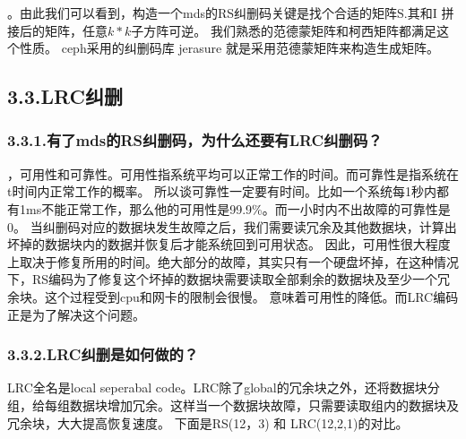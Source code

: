 \documentclass{article}
\begin{document}
。由此我们可以看到，构造一个mds的RS纠删码关键是找个合适的矩阵S.其和I 拼接后的矩阵，任意$k*k$子方阵可逆。
我们熟悉的范德蒙矩阵和柯西矩阵都满足这个性质。 ceph采用的纠删码库 jerasure 就是采用范德蒙矩阵来构造生成矩阵。%

\subsection{3.3.\hspace*{0.5em}LRC纠删}\label{sec-lrc}%

\subsubsection{3.3.1.\hspace*{0.5em}有了mds的RS纠删码，为什么还要有LRC纠删码？}\label{sec-mdsrslrc}%

，可用性和可靠性。可用性指系统平均可以正常工作的时间。而可靠性是指系统在t时间内正常工作的概率。
所以谈可靠性一定要有时间。比如一个系统每1秒内都有1ms不能正常工作，那么他的可用性是99.9\%。而一小时内不出故障的可靠性是0。
当纠删码对应的数据块发生故障之后，我们需要读冗余及其他数据块，计算出坏掉的数据块内的数据并恢复后才能系统回到可用状态。
因此，可用性很大程度上取决于修复所用的时间。绝大部分的故障，其实只有一个硬盘坏掉，在这种情况下，RS编码为了修复这个坏掉的数据块需要读取全部剩余的数据块及至少一个冗余块。这个过程受到cpu和网卡的限制会很慢。
意味着可用性的降低。而LRC编码正是为了解决这个问题。%

\subsubsection{3.3.2.\hspace*{0.5em}LRC纠删是如何做的？}\label{sec-lrc}%

\noindent LRC全名是local seperabal code。LRC除了global的冗余块之外，还将数据块分组，给每组数据块增加冗余。这样当一个数据块故障，只需要读取组内的数据块及冗余块，大大提高恢复速度。
下面是RS(12，3) 和 LRC(12,2,1)的对比。%
\end{document}
